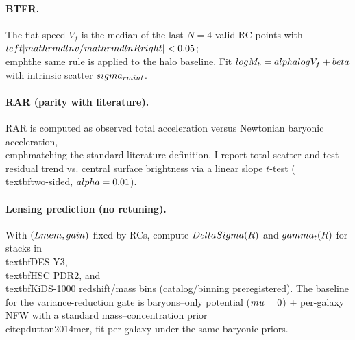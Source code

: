 \documentclass[11pt,a4paper]{article}
\newcommand{\Lmem}{L}       %
\newcommand{\gain}{\mu}     %
\begin{document}
\paragraph{BTFR.}
The flat speed $V_f$ is the median of the last $N=4$ valid RC points with $\\left|\\mathrm{d}\\ln v/\\mathrm{d}\\ln R\\right|<0.05$; \\emph{the same rule is applied to the halo baseline}. Fit $\\log M_b=\\alpha\\log V_f+\\beta$ with intrinsic scatter $\\sigma_{\\rm int}$.

\paragraph{RAR (parity with literature).}
RAR is computed as observed total acceleration versus Newtonian baryonic acceleration, \\emph{matching the standard literature definition}. I report total scatter and test residual trend vs. central surface brightness via a linear slope $t$-test (\\textbf{two-sided, $\\alpha=0.01$}).

\paragraph{Lensing prediction (no retuning).}
With $(\\Lmem,\\gain)$ fixed by RCs, compute $\\Delta\\Sigma(R)$ and $\\gamma_t(R)$ for stacks in \\textbf{DES Y3}, \\textbf{HSC PDR2}, and \\textbf{KiDS-1000} redshift/mass bins (catalog/binning preregistered). The baseline for the variance-reduction gate is baryons–only potential ($\\mu=0$) + per-galaxy NFW with a standard mass–concentration prior \\citep{dutton2014mcr}, fit per galaxy under the same baryonic priors.
\end{document}
